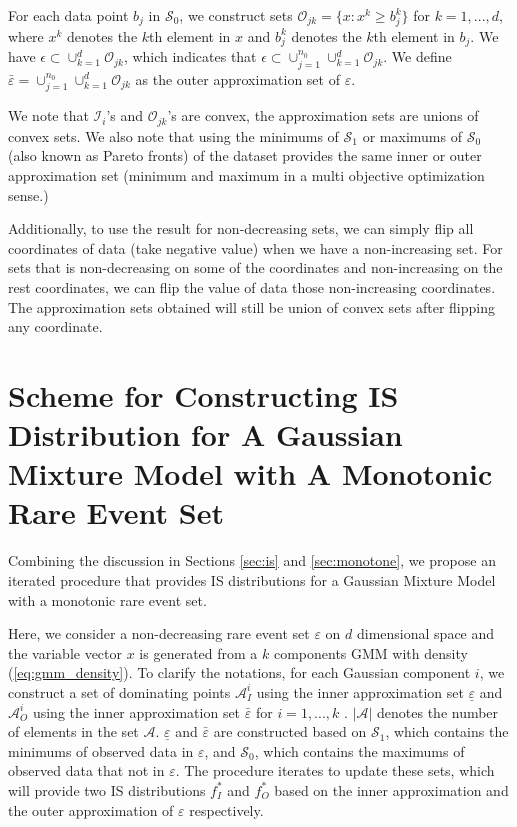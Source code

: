 \documentclass[conference]{IEEEtran}
\begin{document}
 For each data point $b_j$ in $\mathcal{S}_0$, we construct sets $\mathcal{O}_{jk}=\{x:x^k \geq b^k_j\} $ for $k=1,...,d$, where $x^k$ denotes the $k$th element in $x$ and $b^k_j$ denotes the $k$th element in $b_j$. We have $\epsilon \subset \cup_{k=1}^{d} \mathcal{O}_{jk}$, which indicates that $\epsilon \subset \cup_{j=1}^{n_0} \cup_{k=1}^{d} \mathcal{O}_{jk}$. We define $\bar{\varepsilon} = \cup_{j=1}^{n_0} \cup_{k=1}^{d} \mathcal{O}_{jk}$ as the outer approximation set of $\varepsilon $.

We note that $\mathcal{I}_i$'s and $\mathcal{O}_{jk}$'s are convex, the approximation sets are unions of convex sets. We also note that using the minimums of $\mathcal{S}_1$ or maximums of $\mathcal{S}_0$ (also known as Pareto fronts) of the dataset provides the same inner or outer approximation set (minimum and maximum in a multi objective optimization sense.)

Additionally, to use the result for non-decreasing sets, we can simply flip all coordinates of data (take negative value) when we have a non-increasing set. For sets that is non-decreasing on some of the coordinates and non-increasing on the rest coordinates, we can flip the value of data those non-increasing coordinates. The approximation sets obtained will still be union of convex sets after flipping any coordinate.

\section{Scheme for Constructing IS Distribution for A Gaussian Mixture Model with A Monotonic Rare Event Set}

Combining the discussion in Sections \ref{sec:is} and \ref{sec:monotone}, we propose an iterated procedure that provides IS distributions for a Gaussian Mixture Model with a monotonic rare event set.

Here, we consider a non-decreasing rare event set $\varepsilon$ on $d$ dimensional space and the variable vector $x$ is generated from a $k$ components GMM with density (\ref{eq:gmm_density}). To clarify the notations, for each Gaussian component $i$, we construct a set of dominating points $\mathcal{A}_I^i$ using the inner approximation set $\underline{\varepsilon}$ and $\mathcal{A}_O^i$ using the inner approximation set $\bar{\varepsilon}$ for $i=1,...,k$ . $|\mathcal{A}|$ denotes the number of elements in the set $\mathcal{A}$. $\underline{\varepsilon}$ and $\bar{\varepsilon}$ are constructed based on $\mathcal{S}_1$, which contains the minimums of observed data in $\varepsilon$, and $\mathcal{S}_0$, which contains the maximums of observed data that not in $\varepsilon$. The procedure iterates to update these sets, which will provide two IS distributions $f^*_I$ and $f^*_O$ based on the inner approximation and the outer approximation of $\varepsilon$ respectively.
\end{document}
